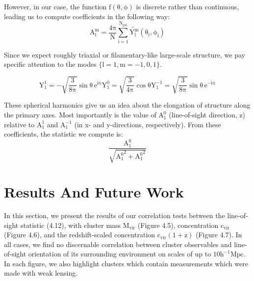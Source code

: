However, in our case, the function $\mathrm{f(\theta,\phi)}$ is discrete rather
than continuous, leading us to compute coefficients in the following way:
\begin{equation}
\mathrm{A_{l}^{m} = \frac{4\pi}{N} \sum_{i=1}^{N_{gal}} \tilde{Y_{l}^{m}}(\theta_{i},\phi_{i})}
\end{equation}

Since we expect roughly triaxial or filamentary-like large-scale structure, we pay
specific attention to the modes $\mathrm{ \{ l=1,m=-1,0,1 \}}$. 

 \begin{subequations}
\begin{equation}
\mathrm{Y_{1}^{1} = -\sqrt{\frac{3}{8\pi}} \sin \theta \,e^{i\phi}}
\end{equation}    
\begin{equation}
\mathrm{Y_{1}^{0} = \sqrt{\frac{3}{4\pi}} \cos \theta}
\end{equation}
\begin{equation}
\mathrm{Y_{1}^{-1} = \sqrt{\frac{3}{8\pi}} \sin \theta \,e^{-i\phi}}
\end{equation}
\end{subequations}


These spherical harmonics 
give us an idea about the elongation
of structure along the primary axes. Most importantly is the value of
$\mathrm{A_{1}^{0}}$ (line-of-sight direction, z) relative to
$\mathrm{A_{1}^{1}}$  and $\mathrm{A_{1}^{-1}}$ (in x- and
y-directions, respectively).  From these coefficients, the statistic we compute
is:
\begin{equation}
\mathrm{\frac{A_{1}^{0}}{\sqrt{{A_{1}^{0}}^{2}+{A_{1}^{0}}^{2}}}}
\end{equation}


\section{Results And Future Work}

In this section, we present the results of our correlation tests between the
line-of-sight statistic (4.12), with cluster mass $\mathrm{M_{vir}}$ (Figure 4.5),
concentration $\mathrm{c_{vir}}$ (Figure 4.6),  and the redshift-scaled concentration
$\mathrm{c_{vir}(1+z)}$ (Figure 4.7). In all cases, we find no discernable correlation
between cluster observables and line-of-sight orientation of its surrounding
environment on scales of up to $\mathrm{10 h^{-1} Mpc}$. In each figure, we
also highlight clusters which contain measurements which were made with weak
lensing.

